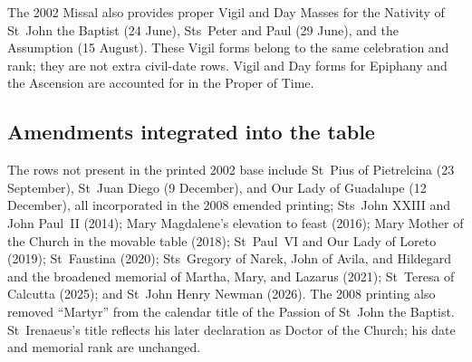 The 2002 Missal also provides proper Vigil and Day Masses for the Nativity of St~John the Baptist (24 June), Sts~Peter and Paul (29 June), and the Assumption (15 August). These Vigil forms belong to the same celebration and rank; they are not extra civil-date rows. Vigil and Day forms for Epiphany and the Ascension are accounted for in the Proper of Time.

\subsection{Amendments integrated into the table}

The rows not present in the printed 2002 base include St~Pius of Pietrelcina (23 September), St~Juan Diego (9 December), and Our Lady of Guadalupe (12 December), all incorporated in the 2008 emended printing; Sts~John XXIII and John Paul~II (2014); Mary Magdalene's elevation to feast (2016); Mary Mother of the Church in the movable table (2018); St~Paul~VI and Our Lady of Loreto (2019); St~Faustina (2020); Sts~Gregory of Narek, John of Avila, and Hildegard and the broadened memorial of Martha, Mary, and Lazarus (2021); St~Teresa of Calcutta (2025); and St~John Henry Newman (2026). The 2008 printing also removed “Martyr” from the calendar title of the Passion of St~John the Baptist. St~Irenaeus's title reflects his later declaration as Doctor of the Church; his date and memorial rank are unchanged.
